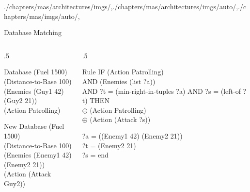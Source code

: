 \begin{graphicspathcontext}{{./chapters/mas/architectures/imgs/},{./chapters/mas/architectures/imgs/auto/},{./chapters/mas/imgs/auto/},\old}
\begin{frame}[t]{Database Matching \insertcontinuationtext}
\begin{columns}[t]
	\begin{column}{.5\linewidth}
		\begin{block}{Database}\ttfamily
			(Fuel 1500) \\
			(Distance-to-Base 100) \\
			(Enemies (Guy1 42) \\
			       (Guy2 21)) \\
			(Action Patrolling)
		\end{block}
		\begin{block}{New Database}\ttfamily
			(Fuel 1500) \\
			(Distance-to-Base 100) \\
			(Enemies (Enemy1 42) \\
			(Enemy2 21)) \\
			(Action (Attack Guy2))
		\end{block}
	\end{column}
	\begin{column}{.5\linewidth}
		\begin{block}{Rule}\ttfamily
			IF (Action Patrolling) \\
			AND (Enemies (list ?a)) \\
			AND ?t = (min-right-in-tuples ?a)
			AND ?s = (left-of ?t)
			THEN \\
			$\ominus$ (Action Patrolling) \\
			$\oplus$ (Action (Attack ?s))
		\end{block}
		\ttfamily
		?a = ((Enemy1 42) (Enemy2 21)) \\
		?t = (Enemy2 21) \\
		?s = end
	\end{column}
\end{columns}
\end{frame}


\end{graphicspathcontext}

